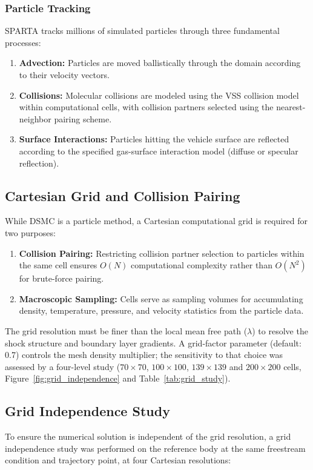 \subsubsection*{Particle Tracking}
SPARTA tracks millions of simulated particles through three fundamental processes:
\begin{enumerate}
    \item \textbf{Advection:} Particles are moved ballistically through the domain according to their velocity vectors.
    \item \textbf{Collisions:} Molecular collisions are modeled using the VSS collision model within computational cells, with collision partners selected using the nearest-neighbor pairing scheme.
    \item \textbf{Surface Interactions:} Particles hitting the vehicle surface are reflected according to the specified gas-surface interaction model (diffuse or specular reflection).
\end{enumerate}

\subsection{Cartesian Grid and Collision Pairing}
While DSMC is a particle method, a Cartesian computational grid is required for two purposes:
\begin{enumerate}
    \item \textbf{Collision Pairing:} Restricting collision partner selection to particles within the same cell ensures $O(N)$ computational complexity rather than $O(N^2)$ for brute-force pairing.
    \item \textbf{Macroscopic Sampling:} Cells serve as sampling volumes for accumulating density, temperature, pressure, and velocity statistics from the particle data.
\end{enumerate}

The grid resolution must be finer than the local mean free path ($\lambda$) to resolve the shock structure and boundary layer gradients. A grid-factor parameter (default: 0.7) controls the mesh density multiplier; the sensitivity to that choice was assessed by a four-level study ($70\times70$, $100\times100$, $139\times139$ and $200\times200$ cells, Figure~\ref{fig:grid_independence} and Table~\ref{tab:grid_study}).

\subsection{Grid Independence Study}
To ensure the numerical solution is independent of the grid resolution, a grid independence study was performed on the reference body at the same freestream condition and trajectory point, at four Cartesian resolutions:

